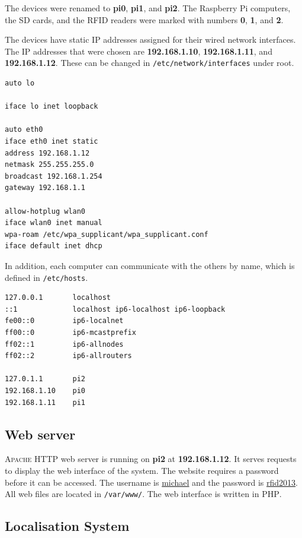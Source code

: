 \documentclass[a4paper,11pt]{scrartcl}
\begin{document}
The devices were renamed to \textbf{pi0}, \textbf{pi1}, and \textbf{pi2}. The Raspberry Pi computers, the SD cards, and the RFID readers were marked with numbers \textbf{0}, \textbf{1}, and \textbf{2}.

The devices have static IP addresses assigned for their wired network interfaces. The IP addresses that were chosen are \textbf{192.168.1.10}, \textbf{192.168.1.11}, and \textbf{192.168.1.12}. These can be changed in \verb!/etc/network/interfaces! under root.

\begin{lstlisting}[caption=The interfaces file of \textbf{pi2}]
auto lo

iface lo inet loopback

auto eth0
iface eth0 inet static
address 192.168.1.12
netmask 255.255.255.0
broadcast 192.168.1.254
gateway 192.168.1.1

allow-hotplug wlan0
iface wlan0 inet manual
wpa-roam /etc/wpa_supplicant/wpa_supplicant.conf
iface default inet dhcp
\end{lstlisting}

In addition, each computer can communicate with the others by name, which is defined in \verb!/etc/hosts!.

\begin{lstlisting}[caption=The hosts file of \textbf{pi2}]
127.0.0.1		localhost
::1				localhost ip6-localhost ip6-loopback
fe00::0			ip6-localnet
ff00::0			ip6-mcastprefix
ff02::1			ip6-allnodes
ff02::2			ip6-allrouters

127.0.1.1		pi2
192.168.1.10	pi0
192.168.1.11	pi1
\end{lstlisting}

\subsection{Web server}

\textsc{Apache} HTTP web server is running on \textbf{pi2} at \textbf{192.168.1.12}. It serves requests to display the web interface of the system. The website requires a password before it can be accessed. The username is \underline{michael} and the password is \underline{rfid2013}. All web files are located in \verb!/var/www/!. The web interface is written in \textsc{PHP}.

\subsection{Localisation System}
\end{document}
